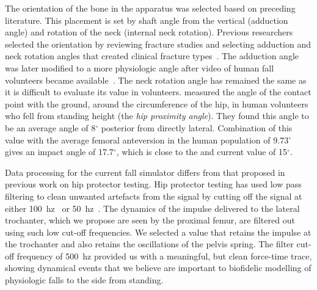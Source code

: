 The orientation of the bone in the apparatus was selected based on preceding literature.
This placement is set by shaft angle from the vertical (adduction angle) and rotation of the neck (internal neck rotation).
Previous researchers selected the orientation by reviewing fracture studies and selecting adduction and neck rotation angles that created clinical fracture types~\citep{lotz_use_1990, backman_proximal_1957}.
The adduction angle was later modified to a more physiologic angle after video of human fall volunteers became available~\citep{courtney_effects_1994}.
The neck rotation angle has remained the same as it is difficult to evaluate its value in volunteers.
 measured the angle of the contact point with the ground, around the circumference of the hip, in human volunteers who fell from standing height (the \emph{hip proximity angle}).
They found this angle to be an average angle of 8$^\circ$ posterior from directly lateral.
Combination of this value with the average femoral anteversion in the human population of 9.73$^\circ$~\citep{toogood_proximal_2009} gives an impact angle of 17.7$^\circ$, which is close to the and current value of 15$^\circ$.

Data processing for the current fall simulator differs from that proposed in previous work on hip protector testing.
Hip protector testing has used low pass filtering to clean unwanted artefacts from the signal by cutting off the signal at either 100~\ac{hz}~\citep{robinovitch_force_1995} or 50~\ac{hz}~\citep{robinovitch_hip_2009}.
The dynamics of the impulse delivered to the lateral trochanter, which we propose are seen by the proximal femur, are filtered out using such low cut-off frequencies.
We selected a value that retains the impulse at the trochanter and also retains the oscillations of the pelvis spring.
The filter cut-off frequency of 500~\ac{hz} provided us with a meaningful, but clean force-time trace, showing dynamical events that we believe are important to biofidelic modelling of physiologic falls to the side from standing.

